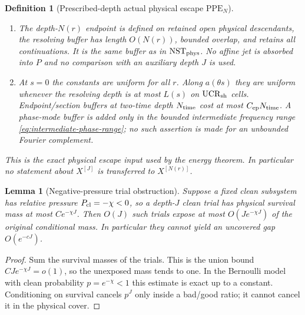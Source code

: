 \documentclass[11pt]{article}
\newtheorem{lemma}[theorem]{Lemma}
\newtheorem{definition}[theorem]{Definition}
\begin{document}
\begin{definition}[Prescribed-depth actual physical escape
$\mathrm{PPE}_{N}$]
\begin{enumerate}[label=\textup{(PPE\arabic*)}]
      control context, stopping, buffer, gate, or continuation failures and
      does not by itself imply the full-$\mathscr W_*$ estimate
      \eqref{eq:tilted-PPE-tail}.
\item The depth-$N(r)$ endpoint is defined on retained open physical
      descendants, the resolving buffer has length $O(N(r))$, bounded
      overlap, and retains all continuations.  It is the same buffer as in
      $\mathrm{NST}_{\rm phys}$.  No affine jet is absorbed into $P$ and no
      comparison with an auxiliary depth $J$ is used.
\item At $s=0$ the constants are uniform for all $r$.  Along
      $a(\theta s)$ they are uniform whenever the resolving depth is at most
      $L(s)$ on $\mathrm{UCR}_{\rm sh}$ cells.  Endpoint/section buffers at
      two-time depth $N_{\rm time}$ cost at most
      $C_{\rm ep}N_{\rm time}$.  A phase-mode buffer is added only in the
      bounded intermediate frequency range
      \eqref{eq:intermediate-phase-range}; no such assertion is made for an
      unbounded Fourier complement.
\end{enumerate}
This is the exact physical escape input used by the energy theorem.  In
particular no statement about $X^{[J]}$ is transferred to $X^{[N(r)]}$.
\end{definition}

\begin{lemma}[Negative-pressure trial obstruction]
\label{lem:negative-pressure-trial-obstruction}
Suppose a fixed clean subsystem has relative pressure
$P_{\rm cl}=-\chi<0$, so a depth-$J$ clean trial has physical survival mass
at most $Ce^{-\chi J}$.  Then $O(J)$ such trials expose at most
$O(Je^{-\chi J})$ of the original conditional mass.  In particular they
cannot yield an uncovered gap $O(e^{-cJ})$.
\end{lemma}

\begin{proof}
Sum the survival masses of the trials.  This is the union bound
$CJ e^{-\chi J}=o(1)$, so the unexposed mass tends to one.  In the Bernoulli
model with clean probability $p=e^{-\chi}<1$ this estimate is exact up to a
constant.  Conditioning on survival cancels $p^J$ only inside a bad/good
ratio; it cannot cancel it in the physical cover.
\end{proof}
\end{document}
